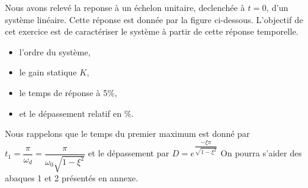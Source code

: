 Nous avons relevé la reponse à un échelon unitaire, 
declenchée à $t=0$, d'un système linéaire.
Cette réponse est donnée par la figure ci-dessous.
L'objectif de cet exercice est de caractériser le système 
à partir de cette réponse temporelle.
\begin{center}
    
\end{center}
\begin{itemize}
    \item l'ordre du système,
    \item le gain statique $K$,
    \item le temps de réponse à 5\%,
    \item et le dépassement relatif en \%.
\end{itemize}
Nous rappelons que le temps du premier maximum est 
donné par $t_1=\dfrac{\pi}{\omega_d}=\dfrac{\pi}{\omega_0\sqrt{1-\xi^2}}$
et le dépassement par $D=e^{\dfrac{-\xi\pi}{\sqrt{1-\xi^2}}}$
On pourra s'aider des abaques 1 et 2 présentés en annexe.
\clearpage
